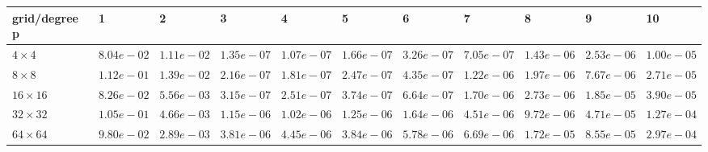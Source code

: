 \begin{tabular}{lllllllllll}
\hline
 grid/degree p   & 1          & 2          & 3          & 4          & 5          & 6          & 7          & 8          & 9          & 10         \\
\hline
 $4 \times 4$    & $8.04e-02$ & $1.11e-02$ & $1.35e-07$ & $1.07e-07$ & $1.66e-07$ & $3.26e-07$ & $7.05e-07$ & $1.43e-06$ & $2.53e-06$ & $1.00e-05$ \\
 $8 \times 8$    & $1.12e-01$ & $1.39e-02$ & $2.16e-07$ & $1.81e-07$ & $2.47e-07$ & $4.35e-07$ & $1.22e-06$ & $1.97e-06$ & $7.67e-06$ & $2.71e-05$ \\
 $16 \times 16$  & $8.26e-02$ & $5.56e-03$ & $3.15e-07$ & $2.51e-07$ & $3.74e-07$ & $6.64e-07$ & $1.70e-06$ & $2.73e-06$ & $1.85e-05$ & $3.90e-05$ \\
 $32 \times 32$  & $1.05e-01$ & $4.66e-03$ & $1.15e-06$ & $1.02e-06$ & $1.25e-06$ & $1.64e-06$ & $4.51e-06$ & $9.72e-06$ & $4.71e-05$ & $1.27e-04$ \\
 $64 \times 64$  & $9.80e-02$ & $2.89e-03$ & $3.81e-06$ & $4.45e-06$ & $3.84e-06$ & $5.78e-06$ & $6.69e-06$ & $1.72e-05$ & $8.55e-05$ & $2.97e-04$ \\
\hline
\end{tabular}